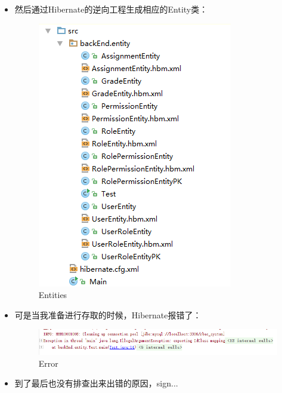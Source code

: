 \begin{itemize}
\begin{enumerate}
\begin{itemize}
			\newpage
			\item
			然后通过Hibernate的逆向工程生成相应的Entity类：
			\begin{figure}[H]
				\centering
				\includegraphics[width=\textwidth]{packages}
				\caption{Entities}
				\label{fig:packages}
			\end{figure}
			
			\newpage
			\item
			可是当我准备进行存取的时候，Hibernate报错了：
			\begin{figure}[H]
				\centering
				\includegraphics[width=\textwidth]{error}
				\caption{Error}
				\label{fig:error}
			\end{figure}
			
			\item
			到了最后也没有排查出来出错的原因，sign...
		\end{itemize}
	

\end{enumerate}
\end{itemize}

